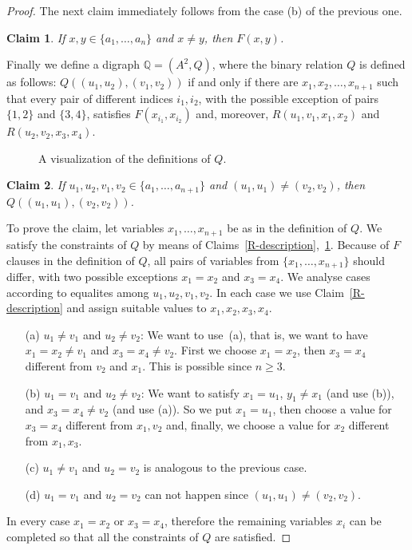 \documentclass[a4paper]{article}
\def\inkpict#1#2#3{\medskip
\begin{figure}[!ht]
  \def\svgwidth{#1}
  \centering
     
  \caption{#3}
\end{figure}
}
\newcommand{\relstr}[1]{\mathbb{#1}}
\newtheorem{claim}{Claim}
\begin{document}
\begin{proof}
The next claim immediately follows from the case (b) of the previous one.

\begin{claim}
  \label{F-description}
  If $x,y\in \{a_1, \ldots, a_n\}$ and $x\neq y$, then $F(x,y)$.
\end{claim}

Finally we define a digraph $\relstr Q=(A^2, Q)$, where
the binary relation $Q$ is defined as follows:
$Q((u_1,u_2),(v_1,v_2))$ if and only if there are
$x_1,x_2,\ldots,x_{n+1}$ such that every pair of different indices
$i_1,i_2$, with the possible exception of pairs $\{1,2\}$ and $\{3,4\}$, satisfies
$F(x_{i_1},x_{i_2})$ and, moreover, $R(u_1,v_1,x_1,x_2)$ and $R(u_2,v_2,x_3,x_4)$.

\inkpict{9cm}{Q-def}{A visualization of the definitions of $Q$.}

\begin{claim}
  If $u_1, u_2, v_1, v_2\in \{a_1, \ldots, a_{n+1}\}$ and
  $(u_1,u_1) \neq (v_2,v_2)$, then $Q((u_1,u_1), (v_2,v_2))$.
\end{claim}
  To prove the claim, let variables $x_1, \ldots, x_{n+1}$ be as in the
  definition of $Q$. We satisfy the constraints of $Q$ by means of 
  Claims~\ref{R-description},~\ref{F-description}. Because of $F$ clauses in the definition of $Q$, all 
  pairs of variables from $\{x_1, \ldots, x_{n+1}\}$ should differ, with two possible exceptions
  $x_1=x_2$ and $x_3=x_4$.
  We analyse cases according to equalites among $u_1,u_2,v_1,v_2$. In each
  case we use Claim~\ref{R-description} and assign suitable values
  to $x_1,x_2,x_3,x_4$.
  \begin{enumerate}
  \item[(a)] $u_1\neq v_1$ and $u_2\neq v_2$: We want to use~(a), that is, we want to have $x_1=x_2\neq v_1$ and $x_3=x_4\neq v_2$. First we
    choose $x_1=x_2$, then $x_3=x_4$ different from $v_2$ and
    $x_1$. This is possible since $n\geq 3$.
  \item[(b)] $u_1=v_1$ and $u_2\neq v_2$: We want to satisfy $x_1=u_1$,
    $y_1\neq x_1$ (and use (b)), and
    $x_3=x_4\neq v_2$ (and use (a)). So we put $x_1=u_1$, then choose a
    value for $x_3=x_4$ different from $x_1, v_2$ and, finally, we choose
    a value for $x_2$ different from $x_1, x_3$.
  \item[(c)] $u_1\neq v_1$ and $u_2=v_2$ is analogous to the previous case.
  \item[(d)] $u_1=v_1$ and $u_2=v_2$ can not happen since
    $(u_1,u_1) \neq (v_2,v_2)$.
  \end{enumerate}
  In every case $x_1=x_2$ or $x_3=x_4$, therefore the remaining variables $x_i$
  can be completed so that all the constraints of $Q$ are satisfied.


\end{proof}
\end{document}
